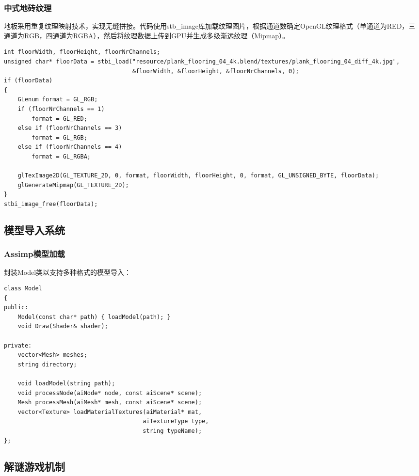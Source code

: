 \documentclass{article}
\begin{document}
\begin{CJK}{UTF8}{gbsn}
\subsubsection{中式地砖纹理}
地板采用重复纹理映射技术，实现无缝拼接。代码使用stb\_image库加载纹理图片，根据通道数确定OpenGL纹理格式（单通道为RED，三通道为RGB，四通道为RGBA），然后将纹理数据上传到GPU并生成多级渐远纹理（Mipmap）。

\begin{lstlisting}[caption=地板纹理加载与设置]
int floorWidth, floorHeight, floorNrChannels;
unsigned char* floorData = stbi_load("resource/plank_flooring_04_4k.blend/textures/plank_flooring_04_diff_4k.jpg", 
                                     &floorWidth, &floorHeight, &floorNrChannels, 0);
if (floorData)
{
    GLenum format = GL_RGB;
    if (floorNrChannels == 1)
        format = GL_RED;
    else if (floorNrChannels == 3)
        format = GL_RGB;
    else if (floorNrChannels == 4)
        format = GL_RGBA;
    
    glTexImage2D(GL_TEXTURE_2D, 0, format, floorWidth, floorHeight, 0, format, GL_UNSIGNED_BYTE, floorData);
    glGenerateMipmap(GL_TEXTURE_2D);
}
stbi_image_free(floorData);
\end{lstlisting}

\subsection{模型导入系统}

\subsubsection{Assimp模型加载}
封装Model类以支持多种格式的模型导入：

\begin{lstlisting}[caption=Model类核心结构]
class Model
{
public:
    Model(const char* path) { loadModel(path); }
    void Draw(Shader& shader);
    
private:
    vector<Mesh> meshes;
    string directory;
    
    void loadModel(string path);
    void processNode(aiNode* node, const aiScene* scene);
    Mesh processMesh(aiMesh* mesh, const aiScene* scene);
    vector<Texture> loadMaterialTextures(aiMaterial* mat, 
                                        aiTextureType type, 
                                        string typeName);
};
\end{lstlisting}

\subsection{解谜游戏机制}


\end{CJK}
\end{document}
